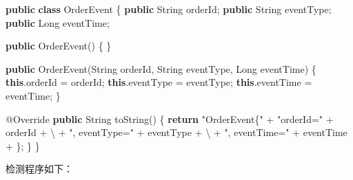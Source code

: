 \documentclass[cn,11pt,chinese]{elegantbook}
\newenvironment{Shaded}{}{}
\newcommand{\AttributeTok}[1]{\textcolor[rgb]{0.49,0.56,0.16}{#1}}
\newcommand{\BuiltInTok}[1]{#1}
\newcommand{\CharTok}[1]{\textcolor[rgb]{0.25,0.44,0.63}{#1}}
\newcommand{\FunctionTok}[1]{\textcolor[rgb]{0.02,0.16,0.49}{#1}}
\newcommand{\KeywordTok}[1]{\textcolor[rgb]{0.00,0.44,0.13}{\textbf{#1}}}
\newcommand{\NormalTok}[1]{#1}
\newcommand{\StringTok}[1]{\textcolor[rgb]{0.25,0.44,0.63}{#1}}
\begin{document}
\begin{Shaded}
\begin{Highlighting}[]
\KeywordTok{public} \KeywordTok{class}\NormalTok{ OrderEvent \{}
    \KeywordTok{public} \BuiltInTok{String}\NormalTok{ orderId;}
    \KeywordTok{public} \BuiltInTok{String}\NormalTok{ eventType;}
    \KeywordTok{public} \BuiltInTok{Long}\NormalTok{ eventTime;}

    \KeywordTok{public} \FunctionTok{OrderEvent}\NormalTok{() \{}
\NormalTok{    \}}

    \KeywordTok{public} \FunctionTok{OrderEvent}\NormalTok{(}\BuiltInTok{String}\NormalTok{ orderId, }\BuiltInTok{String}\NormalTok{ eventType, }\BuiltInTok{Long}\NormalTok{ eventTime) \{}
        \KeywordTok{this}\NormalTok{.}\FunctionTok{orderId}\NormalTok{ = orderId;}
        \KeywordTok{this}\NormalTok{.}\FunctionTok{eventType}\NormalTok{ = eventType;}
        \KeywordTok{this}\NormalTok{.}\FunctionTok{eventTime}\NormalTok{ = eventTime;}
\NormalTok{    \}}

    \AttributeTok{@Override}
    \KeywordTok{public} \BuiltInTok{String} \FunctionTok{toString}\NormalTok{() \{}
        \KeywordTok{return} \StringTok{"OrderEvent\{"}\NormalTok{ +}
                \StringTok{"orderId=\textquotesingle{}"}\NormalTok{ + orderId + }\CharTok{\textquotesingle{}\textbackslash{}\textquotesingle{}\textquotesingle{}}\NormalTok{ +}
                \StringTok{", eventType=\textquotesingle{}"}\NormalTok{ + eventType + }\CharTok{\textquotesingle{}\textbackslash{}\textquotesingle{}\textquotesingle{}}\NormalTok{ +}
                \StringTok{", eventTime="}\NormalTok{ + eventTime +}
                \CharTok{\textquotesingle{}\}\textquotesingle{}}\NormalTok{;}
\NormalTok{    \}}
\NormalTok{\}}
\end{Highlighting}
\end{Shaded}

检测程序如下：
\end{document}
